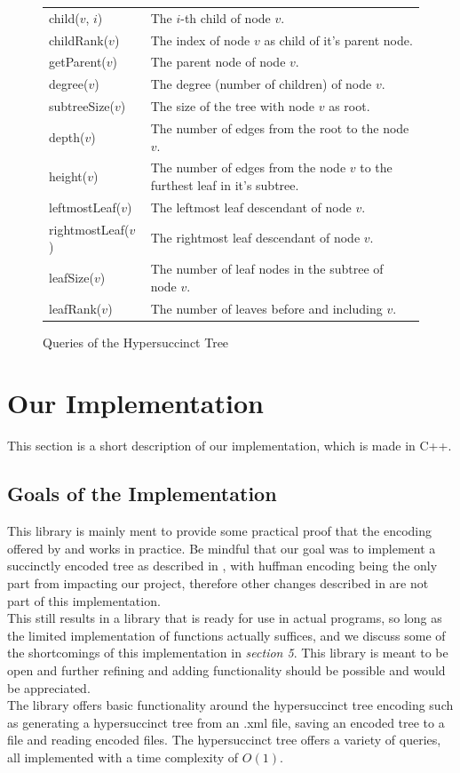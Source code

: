 \documentclass{article}
\begin{document}
\begin{figure}[H]
\begin{tabular}{ |p{3.5cm}p{8cm}|} 
 \hline
 child($v$, $i$) & The $i$-th child of node $v$. \\
 childRank($v$) & The index of node $v$ as child of it's parent node. \\
 getParent($v$) & The parent node of node $v$. \\
 degree($v$) & The degree (number of children) of node $v$. \\
 subtreeSize($v$) & The size of the tree with node $v$ as root. \\
 depth($v$) &  The number of edges from the root to the node $v$. \\
 height($v$) & The number of edges from the node $v$ to the furthest leaf in it's subtree. \\
 leftmostLeaf($v$) & The leftmost leaf descendant of node $v$. \\
 rightmostLeaf($v$) & The rightmost leaf descendant of node $v$. \\
 leafSize($v$) & The number of leaf nodes in the subtree of node $v$. \\
 leafRank($v$) & The number of leaves before and including $v$. \\
 \hline
\end{tabular}
\caption{Queries of the Hypersuccinct Tree}
\label{2.1:table1}
\end{figure}

\section{Our Implementation}
This section is a short description of our implementation, which is made in C++.

\subsection{Goals of the Implementation}
This library is mainly ment to provide some practical proof that the encoding offered by \cite{farzanMunro} and \cite{universalSuccinct} works in practice. Be mindful that our goal was to implement a succinctly encoded tree as described in \cite{farzanMunro}, with huffman encoding being the only part from \cite{universalSuccinct} impacting our project, therefore other changes described in \cite{universalSuccinct} are not part of this implementation.\\
This still results in a library that is ready for use in actual programs, so long as the limited implementation of functions actually suffices, and we discuss some of the shortcomings of this implementation in \textit{section 5}. This library is meant to be open and further refining and adding functionality should be possible and would be appreciated.\\
The library offers basic functionality around the hypersuccinct tree encoding such as generating a hypersuccinct tree from an .xml file, saving an encoded tree to a file and reading encoded files. The hypersuccinct tree offers a variety of queries, all implemented with a time complexity of $O(1)$.
\end{document}

